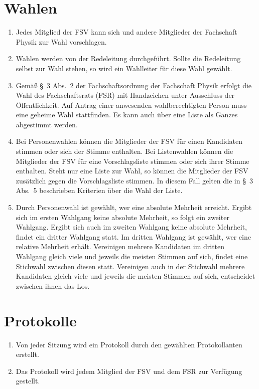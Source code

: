\section{Wahlen}
\begin{enumerate}
	\item Jedes Mitglied der FSV kann sich und andere Mitglieder der Fachschaft Physik zur Wahl vorschlagen.
	\item Wahlen werden von der Redeleitung durchgeführt.
	Sollte die Redeleitung selbst zur Wahl stehen, so wird ein Wahlleiter für diese Wahl gewählt.
	\item Gemäß §~3 Abs.~2 der Fachschaftsordnung der Fachschaft Physik erfolgt die Wahl des Fachschaftsrats (FSR) mit Handzeichen unter Ausschluss der Öffentlichkeit.
	Auf Antrag einer anwesenden wahlberechtigten Person muss eine geheime Wahl stattfinden.
	Es kann auch über eine Liste als Ganzes abgestimmt werden.
	\item Bei Personenwahlen können die Mitglieder der FSV für einen Kandidaten stimmen oder sich der Stimme enthalten.
	Bei Listenwahlen können die Mitglieder der FSV für eine Vorschlagsliste stimmen oder sich ihrer Stimme enthalten.
	Steht nur eine Liste zur Wahl, so können die Mitglieder der FSV zusätzlich gegen die Vorschlagsliste stimmen.
	In diesem Fall gelten die in §~3 Abs.~5 beschrieben Kriterien über die Wahl der Liste.
	\item Durch Personenwahl ist gewählt, wer eine absolute Mehrheit erreicht.
	Ergibt sich im ersten Wahlgang keine absolute Mehrheit, so folgt ein zweiter Wahlgang.
	Ergibt sich auch im zweiten Wahlgang keine absolute Mehrheit, findet ein dritter Wahlgang statt.
	Im dritten Wahlgang ist gewählt, wer eine relative Mehrheit erhält.
	Vereinigen mehrere Kandidaten im dritten Wahlgang gleich viele und jeweils die meisten Stimmen auf sich, findet eine Stichwahl zwischen diesen statt.
	Vereinigen auch in der Stichwahl mehrere Kandidaten gleich viele und jeweils die meisten Stimmen auf sich, entscheidet zwischen ihnen das Los.
\end{enumerate}

\section{Protokolle}
\begin{enumerate}
	\item Von jeder Sitzung wird ein Protokoll durch den gewählten Protokollanten erstellt.
	\item Das Protokoll wird jedem Mitglied der FSV und dem FSR zur Verfügung gestellt.
\end{enumerate}

